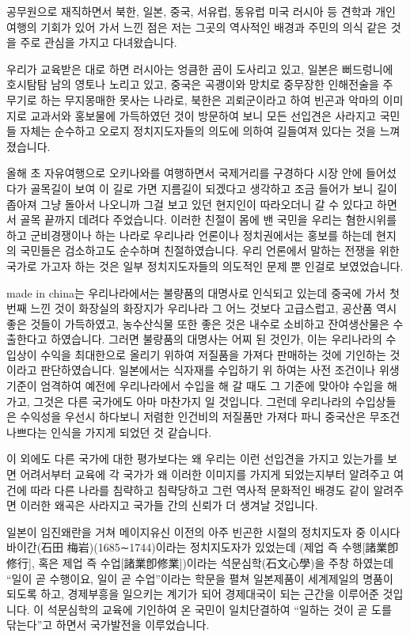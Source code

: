 \documentclass[chapter,book,openany,twoside]{oblivoir}
\begin{document}
공무원으로 재직하면서 북한, 일본, 중국, 서유럽, 동유럽 미국 러시아 등 견학과 개인여행의 기회가 있어 가서 느낀 점은 저는 그곳의 역사적인 배경과 주민의 의식 같은 것을 주로 관심을 가지고 다녀왔습니다.

우리가 교육받은 대로 하면 러시아는 엉큼한 곰이 도사리고 있고, 일본은 뻐드렁니에 호시탐탐 남의 영토나 노리고 있고, 중국은 곡괭이와 망치로 중무장한 인해전술을 주 무기로 하는 무지몽매한 못사는 나라로, 북한은 괴뢰군이라고 하여 빈곤과 악마의 이미지로 교과서와 홍보물에 가득하였던 것이 방문하여 보니 모든 선입견은 사라지고 국민들 자체는 순수하고 오로지 정치지도자들의 의도에 의하여 길들여져 있다는 것을 느껴졌습니다.

올해 초 자유여행으로 오키나와를 여행하면서 국제거리를 구경하다 시장 안에 들어섰다가 골목길이 보여 이 길로 가면 지름길이 되겠다고 생각하고 조금 들어가 보니 길이 좁아져 그냥 돌아서 나오니까 그걸 보고 있던 현지인이 따라오더니 갈 수 있다고 하면서 골목 끝까지 데려다 주었습니다. 이러한 친절이 몸에 밴 국민을 우리는 혐한시위를 하고 군비경쟁이나 하는 나라로 우리나라 언론이나 정치권에서는 홍보를 하는데 현지의 국민들은 검소하고도 순수하며 친절하였습니다. 우리 언론에서 말하는 전쟁을 위한 국가로 가고자 하는 것은 일부 정치지도자들의 의도적인 문제 뿐 인걸로 보였었습니다.

made in china는 우리나라에서는 불량품의 대명사로 인식되고 있는데 중국에 가서 첫 번째 느낀 것이 화장실의 화장지가 우리나라 그 어느 것보다 고급스럽고, 공산품 역시 좋은 것들이 가득하였고, 농수산식물 또한 좋은 것은 내수로 소비하고 잔여생산물은 수출한다고 하였습니다. 그러면 불량품의 대명사는 어찌 된 것인가, 이는 우리나라의 수입상이 수익을 최대한으로 올리기 위하여 저질품을 가져다 판매하는 것에 기인하는 것이라고 판단하였습니다. 일본에서는 식자재를 수입하기 위 하여는 사전 조건이나 위생기준이 엄격하여 예전에 우리나라에서 수입을 해 갈 때도 그 기준에 맞아야 수입을 해가고, 그것은 다른 국가에도 아마 마찬가지 일 것입니다. 그런데 우리나라의 수입상들은 수익성을 우선시 하다보니 저렴한 인건비의 저질품만 가져다 파니 중국산은 무조건 나쁘다는 인식을 가지게 되었던 것 같습니다. 

이 외에도 다른 국가에 대한 평가보다는 왜 우리는 이런 선입견을 가지고 있는가를 보면 어려서부터 교육에 각 국가가 왜 이러한 이미지를 가지게 되었는지부터 알려주고 여건에 따라 다른 나라를 침략하고 침략당하고 그런 역사적 문화적인 배경도 같이 알려주면 이러한 왜곡은 사라지고 국가들 간의 신뢰가 더 생겨날 것입니다.

일본이 임진왜란을 거쳐 메이지유신 이전의 아주 빈곤한 시절의 정치지도자 중 이시다바이간(石田 梅岩)(1685∼1744)이라는 정치지도자가 있었는데 (제업 즉 수행[諸業卽修行], 혹은 제업 즉 수업[諸業卽修業])이라는 석문심학(石文心學)을 주창 하였는데 ``일이 곧 수행이요, 일이 곧 수업''이라는 학문을 펼쳐 일본제품이 세계제일의 명품이 되도록 하고, 경제부흥을 일으키는 계기가 되어 경제대국이 되는 근간을 이루어준 것입니다. 이 석문심학의 교육에 기인하여 온 국민이 일치단결하여 ``일하는 것이 곧 도를 닦는다''고 하면서 국가발전을 이루었습니다.
\end{document}
